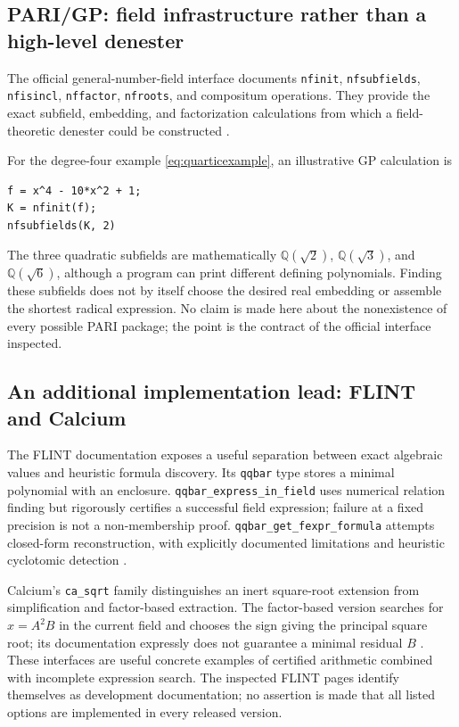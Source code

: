 \documentclass[11pt,letterpaper]{article}
\numberwithin{equation}{section}
\theoremstyle{definition}
\theoremstyle{remark}
\newcommand{\Q}{\mathbb{Q}}
\begin{document}
\subsection{PARI/GP: field infrastructure rather than a high-level denester}
The official general-number-field interface documents \texttt{nfinit}, \texttt{nfsubfields}, \texttt{nfisincl}, \texttt{nffactor}, \texttt{nfroots}, and compositum operations. They provide the exact subfield, embedding, and factorization calculations from which a field-theoretic denester could be constructed \cite{pari}.

For the degree-four example \eqref{eq:quarticexample}, an illustrative GP calculation is
\begin{lstlisting}
f = x^4 - 10*x^2 + 1;
K = nfinit(f);
nfsubfields(K, 2)
\end{lstlisting}
The three quadratic subfields are mathematically $\Q(\sqrt2)$, $\Q(\sqrt3)$, and $\Q(\sqrt6)$, although a program can print different defining polynomials. Finding these subfields does not by itself choose the desired real embedding or assemble the shortest radical expression. No claim is made here about the nonexistence of every possible PARI package; the point is the contract of the official interface inspected.

\subsection{An additional implementation lead: FLINT and Calcium}
The FLINT documentation exposes a useful separation between exact algebraic values and heuristic formula discovery. Its \texttt{qqbar} type stores a minimal polynomial with an enclosure. \texttt{qqbar\_express\_in\_field} uses numerical relation finding but rigorously certifies a successful field expression; failure at a fixed precision is not a non-membership proof. \texttt{qqbar\_get\_fexpr\_formula} attempts closed-form reconstruction, with explicitly documented limitations and heuristic cyclotomic detection \cite{flint}.

Calcium's \texttt{ca\_sqrt} family distinguishes an inert square-root extension from simplification and factor-based extraction. The factor-based version searches for $x=A^2B$ in the current field and chooses the sign giving the principal square root; its documentation expressly does not guarantee a minimal residual $B$ \cite{calcium}. These interfaces are useful concrete examples of certified arithmetic combined with incomplete expression search. The inspected FLINT pages identify themselves as development documentation; no assertion is made that all listed options are implemented in every released version.
\end{document}
